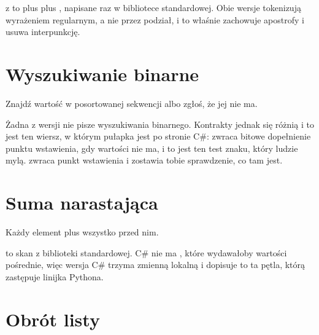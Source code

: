 

\noindent
{} z  to  plus  plus , napisane raz w bibliotece standardowej. Obie wersje tokenizują wyrażeniem regularnym, a nie przez podział, i to właśnie zachowuje apostrofy i usuwa interpunkcję.

\section{Wyszukiwanie binarne}
\label{sec:appD-binary-search}

\noindent
Znajdź wartość w posortowanej sekwencji albo zgłoś, że jej nie ma.



\noindent
Żadna z wersji nie pisze wyszukiwania binarnego. Kontrakty jednak się różnią i to jest ten wiersz, w którym pułapka jest po stronie C\#:  zwraca bitowe dopełnienie punktu wstawienia, gdy wartości nie ma, i to jest ten test znaku, który ludzie mylą.  zwraca punkt wstawienia i zostawia tobie sprawdzenie, co tam jest.

\section{Suma narastająca}
\label{sec:appD-running-total}

\noindent
Każdy element plus wszystko przed nim.



\noindent
{} to skan z biblioteki standardowej. C\# nie ma , które wydawałoby wartości pośrednie, więc wersja C\# trzyma zmienną lokalną i dopisuje \dash{} to ta pętla, którą zastępuje linijka Pythona.

\section{Obrót listy}
\label{sec:appD-rotate}

